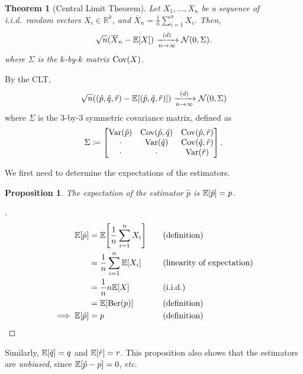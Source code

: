 \documentclass[letterpaper, reqno]{amsart}
\newtheorem{theorem}{Theorem}[section]
\newtheorem{prop}{Proposition}[section]
\renewcommand{\qedsymbol}{\ensuremath{\blacksquare}}
\newenvironment{subproof}[1][\proofname]{%
  \renewcommand{\qedsymbol}{\ensuremath{\square}}%
  \begin{proof}[#1]%
}{%
  \end{proof}%
}
\numberwithin{equation}{section}
\newcommand{\E}[1]{\mathbb{E}\mleft[#1\mright]}
\newcommand{\Var}[1]{\operatorname{Var}\mleft(#1\mright)}
\newcommand{\Cov}[1]{\operatorname{Cov}\mleft(#1\mright)}
\newcommand{\R}{\mathbb{R}}  %
\newcommand{\N}[2]{\mathcal{N}\mleft( #1, #2 \mright)}
\newcommand{\iid}{i.i.d.}
\newcommand{\sumi}[2]{\sum_{#1=1}^{#2}}
\newcommand{\avg}[2]{\frac{1}{#2}\sumi{#1}{#2}}
\newcommand{\by}[1]{&\quad&\text{(#1)}}
\newcommand{\Dlim}{\xrightarrow[n \to \infty]{(d)}}
\newcommand{\phat}{\hat{p}}
\newcommand{\qhat}{\hat{q}}
\newcommand{\rhat}{\hat{r}}
\newcommand{\Xnbar}{\overline{X}_n}
\DeclareMathOperator{\Ber}{Ber}
\begin{document}
\begin{theorem}[Central Limit Theorem]
    Let $X_1, \dots, X_n$ be a sequence of \iid\ random vectors $X_i \in \R^k$, 
    and $\Xnbar = \avg{i}{n} X_i$.
    Then,
    \[ \sqrt{n}(\Xnbar - \E{X}) \Dlim \N{0}{\Sigma}. \]
    where $\Sigma$ is the $k$-by-$k$ matrix $\Cov{X}$.
\end{theorem}

By the CLT,
\begin{equation} \label{eq:CLT}
  \sqrt{n} ((\phat, \qhat, \rhat) - \E{(\phat, \qhat, \rhat)}) \Dlim \N{0}{\Sigma}
\end{equation}
where $\Sigma$ is the 3-by-3 symmetric covariance matrix, defined as
\begin{equation}
  \Sigma \coloneqq 
  \begin{bmatrix}
    \Var{\phat} & \Cov{\phat, \qhat} & \Cov{\phat, \rhat} \\
    \cdot & \Var{\qhat} & \Cov{\qhat, \rhat} \\
    \cdot & \cdot & \Var{\rhat}
  \end{bmatrix}.
\end{equation}

We first need to determine the expectations of the estimators.

\begin{prop}
  The expectation of the estimator $\phat$ is $\E{\phat} = p$.
\end{prop}
\begin{subproof}
  \begin{alignat*}{3}
    \E{\phat} &= \E{\avg{i}{n} X_i} \by{definition} \\
              &= \frac{1}{n} \sumi{i}{n} \E{X_i} \by{linearity of expectation} \\
              &= \frac{1}{n} n \E{X} \by{\iid} \\
              &= \E{\Ber(p)} \by{definition} \\
    \implies \E{\phat} &= p \by{definition} \tag*{\qedhere}
  \end{alignat*}
\end{subproof}
\noindent Similarly, $\E{\qhat} = q$ and $\E{\rhat} = r$. This proposition
also shows that the estimators are \emph{unbiased}, since $\E{\phat - p} = 0$,
\emph{etc}.
\end{document}

